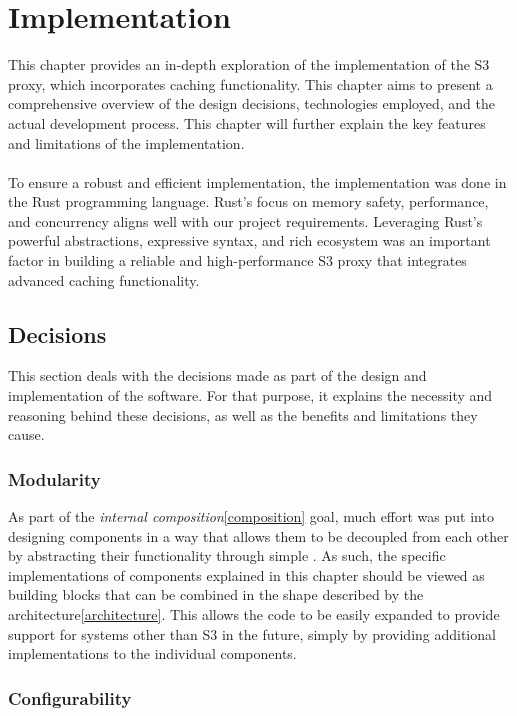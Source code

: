 \chapter{Implementation}

This chapter provides an in-depth exploration of the implementation of the S3 proxy, which incorporates caching functionality. This chapter aims to present a comprehensive overview of the design decisions, technologies employed, and the actual development process. This chapter will further explain the key features and limitations of the implementation.
\\\\
To ensure a robust and efficient implementation, the implementation was done in the Rust programming language. Rust's focus on memory safety, performance, and concurrency aligns well with our project requirements. Leveraging Rust's powerful abstractions, expressive syntax, and rich ecosystem was an important factor in building a reliable and high-performance S3 proxy that integrates advanced caching functionality.

\section{Decisions}

This section deals with the decisions made as part of the design and implementation of the software. For that purpose, it explains the necessity and reasoning behind these decisions, as well as the benefits and limitations they cause.

\subsection{Modularity}

As part of the \textit{internal composition}\ref{composition} goal, much effort was put into designing components in a way that allows them to be decoupled from each other by abstracting their functionality through simple . As such, the specific implementations of components explained in this chapter should be viewed as building blocks that can be combined in the shape described by the architecture\ref{architecture}.
This allows the code to be easily expanded to provide support for systems other than S3 in the future, simply by providing additional implementations to the individual components.

\subsection{Configurability}

